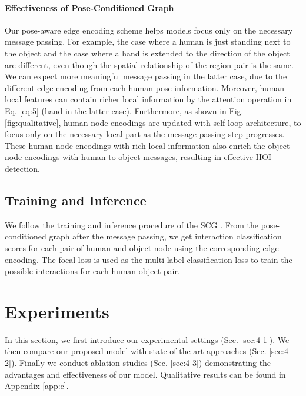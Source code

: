 \documentclass[10pt,twocolumn,letterpaper]{article}
\begin{document}
\paragraph{Effectiveness of Pose-Conditioned Graph}
Our pose-aware edge encoding scheme helps models focus only on the necessary message passing. For example, the case where a human is just standing next to the object and the case where a hand is extended to the direction of the object are different, even though the spatial relationship of the region pair is the same. We can expect more meaningful message passing in the latter case, due to the different edge encoding from each human pose information. Moreover, human local features can contain richer local information by the attention operation in Eq. \ref{eq:5} (hand in the latter case). Furthermore, as shown in Fig. \ref{fig:qualitative}, human node encodings are updated with self-loop architecture, to focus only on the necessary local part as the message passing step progresses. These human node encodings with rich local information also enrich the object node encodings with human-to-object messages, resulting in effective HOI detection. 

\subsection{Training and Inference}
\label{sec:3-3}
We follow the training and inference procedure of the SCG \cite{zhang2021spatially, zhang2022efficient}. From the pose-conditioned graph after the message passing, we get interaction classification scores for each pair of human and object node using the corresponding edge encoding. The focal loss \cite{lin2017focal} is used as the multi-label classification loss to train the possible interactions for each human-object pair.











\section{Experiments}
\label{sec:4}
In this section, we first introduce our experimental settings (Sec. \ref{sec:4-1}). We then compare our proposed model with state-of-the-art approaches (Sec. \ref{sec:4-2}). Finally we conduct ablation studies (Sec. \ref{sec:4-3}) demonstrating the advantages and effectiveness of our model. Qualitative results can be found in Appendix \ref{app:c}.
\end{document}
